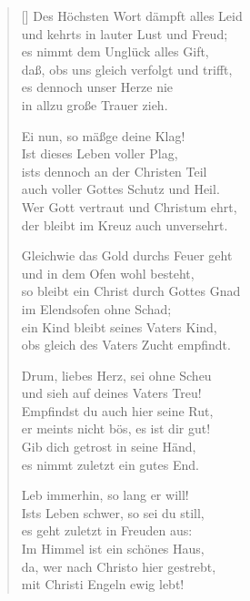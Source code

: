 \begin{multicols}{2}
\begin{verse}[\versewidth]
 Des Höchsten Wort dämpft alles Leid\\
und kehrts in lauter Lust und Freud;\\
es nimmt dem Unglück alles Gift,\\
daß, obs uns gleich verfolgt und trifft,\\
es dennoch unser Herze nie\\
in allzu große Trauer zieh.

 Ei nun, so mäßge deine Klag!\\
Ist dieses Leben voller Plag,\\
ists dennoch an der Christen Teil\\
auch voller Gottes Schutz und Heil.\\
Wer Gott vertraut und Christum ehrt,\\
der bleibt im Kreuz auch unversehrt.

 Gleichwie das Gold durchs Feuer geht\\
und in dem Ofen wohl besteht,\\
so bleibt ein Christ durch Gottes Gnad\\
im Elendsofen ohne Schad;\\
ein Kind bleibt seines Vaters Kind,\\
obs gleich des Vaters Zucht empfindt.

 Drum, liebes Herz, sei ohne Scheu\\
und sieh auf deines Vaters Treu!\\
Empfindst du auch hier seine Rut,\\
er meints nicht bös, es ist dir gut!\\
Gib dich getrost in seine Händ,\\
es nimmt zuletzt ein gutes End.

 Leb immerhin, so lang er will!\\
Ists Leben schwer, so sei du still,\\
es geht zuletzt in Freuden aus:\\
Im Himmel ist ein schönes Haus,\\
da, wer nach Christo hier gestrebt,\\
mit Christi Engeln ewig lebt!
   
\end{verse}
\end{multicols}
